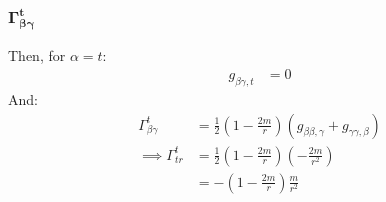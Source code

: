 \documentclass[a4paper]{article}
\begin{document}
\subsubsection{$\boldsymbol{\Gamma^t_{\beta \gamma}}$}
Then, for $\alpha = t$:
\begin{align*}
	g_{\beta\gamma,t} &= 0
\end{align*}
And:
\begin{align*}
	\Gamma^t_{\beta \gamma} &= \frac{1}{2}  \left(1-\frac{2m}{r}\right) (g_{\beta \beta, \gamma} + g_{\gamma \gamma, \beta})\\
	\implies \Gamma^t_{t r} &= \frac{1}{2}  \left(1-\frac{2m}{r}\right)\left(-\frac{2m}{r^2} \right)\\
	&= -\left(1-\frac{2m}{r}\right)\frac{m}{r^2}
\end{align*}


\end{document}
